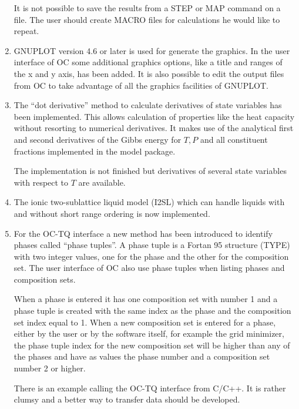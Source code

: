 \documentclass[12pt]{article}
\begin{document}
\begin{enumerate}
  It is not possible to save the results from a STEP or MAP command on
  a file.  The user should create MACRO files for calculations he
  would like to repeat.

\item GNUPLOT version 4.6 or later is used for generate the graphics.
  In the user interface of OC some additional graphics options, like a
  title and ranges of the x and y axis, has been added.  It is also
  possible to edit the output files from OC to take advantage of all
  the graphics facilities of GNUPLOT.


\item The ``dot derivative'' method to calculate derivatives of state
  variables has been implemented.  This allows calculation of
  properties like the heat capacity without resorting to numerical
  derivatives.  It makes use of the analytical first and second
  derivatives of the Gibbs energy for $T, P$ and all constituent
  fractions implemented in the model package.

  The implementation is not finished but derivatives of several state
  variables with respect to $T$ are available.

\item The ionic two-sublattice liquid model (I2SL) which can handle
  liquids with and without short range ordering is now implemented.

\item For the OC-TQ interface a new method has been introduced to
  identify phases called ``phase tuples''.  A phase tuple is a Fortan
  95 structure (TYPE) with two integer values, one for the phase and
  the other for the composition set.  The user interface of OC also
  use phase tuples when listing phases and composition sets.

  When a phase is entered it has one composition set with number 1 and
  a phase tuple is created with the same index as the phase and the
  composition set index equal to 1.  When a new composition set is
  entered for a phase, either by the user or by the software itself,
  for example the grid minimizer, the phase tuple index for the new
  composition set will be higher than any of the phases and have as
  values the phase number and a composition set number 2 or higher.

  There is an example calling the OC-TQ interface from C/C++.  It is
  rather clumsy and a better way to transfer data should be developed.


\end{enumerate}
\end{document}
